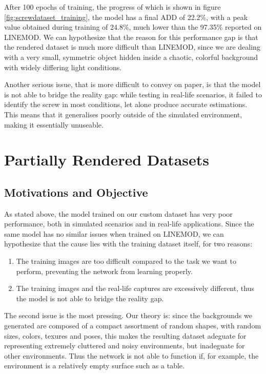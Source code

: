 After 100 epochs of training, the progress of which is shown in figure \ref{fig:screwdataset_training}, the model has a final ADD of 22.2\%, with a peak value obtained during training of 24.8\%, much lower than the 97.35\% reported on LINEMOD. We can hypothesize that the reason for this performance gap is that the rendered dataset is much more difficult than LINEMOD, since we are dealing with a very small, symmetric object hidden inside a chaotic, colorful background with widely differing light conditions.

Another serious issue, that is more difficult to convey on paper, is that the model is not able to bridge the reality gap: while testing in real-life scenarios, it failed to identify the screw in most conditions, let alone produce accurate estimations. This means that it generalises poorly outside of the simulated environment, making it essentially unuseable.

\section{Partially Rendered Datasets}

\subsection{Motivations and Objective}

As stated above, the model trained on our custom dataset has very poor performance, both in simulated scenarios and in real-life applications. Since the same model has no similar issues when trained on LINEMOD, we can hypothesize that the cause lies with the training dataset itself, for two reasons:

\begin{enumerate}
    \item The training images are too difficult compared to the task we want to perform, preventing the network from learning properly.
    \item The training images and the real-life captures are excessively different, thus the model is not able to bridge the reality gap.
\end{enumerate}

The second issue is the most pressing. Our theory is: since the backgrounds we generated are composed of a compact assortment of random shapes, with random sizes, colors, texures and poses, this makes the resulting dataset adeguate for representing extremely cluttered and noisy environments, but inadeguate for other environments. Thus the network is not able to function if, for example, the environment is a relatively empty surface such as a table.

